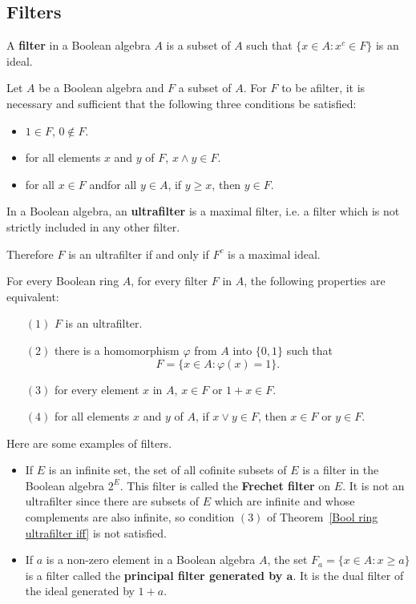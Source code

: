\subsection{Filters}
\begin{definition}
A \textbf{filter} in a Boolean algebra $A$ is a subset of $A$ such that $\{x\in A:x^c\in F\}$ is an ideal.
\end{definition}
\begin{proposition}
Let $A$ be a Boolean algebra and $F$ a subset of $A$. For $F$ to be afilter, it is necessary and sufficient that the following three conditions be satisfied:
\begin{itemize}
\item $1\in F$, $0\notin F$.
\item for all elements $x$ and $y$ of $F$, $x\wedge y\in F$.
\item for all $x\in F$ andfor all $y\in A$, if $y\geq x$, then $y\in F$.
\end{itemize}
\end{proposition}
\begin{definition}
In a Boolean algebra, an \textbf{ultrafilter} is a maximal filter, i.e. a filter which is not strictly included in any other filter.
\end{definition}
Therefore $F$ is an ultrafilter if and only if $F^c$ is a maximal ideal.
\begin{theorem}\label{Bool ring ultrafilter iff}
For every Boolean ring $A$, for every filter $F$ in $A$, the following properties are equivalent:
\begin{itemize}
\item[$(1)$] $F$ is an ultrafilter.
\item[$(2)$] there is a homomorphism $\varphi$ from $A$ into $\{0,1\}$ such that
\[F=\{x\in A:\varphi(x)=1\}.\] 
\item[$(3)$] for every element $x$ in $A$, $x\in F$ or $1+x\in F$.
\item[$(4)$] for all elements $x$ and $y$ of $A$, if $x\vee y\in F$, then $x\in F$ or $y\in F$.
\end{itemize}
\end{theorem}
\begin{example}
Here are some examples of filters.
\begin{itemize}
\item If $E$ is an infinite set, the set of all cofinite subsets of $E$ is a filter in the Boolean algebra $2^E$. 
This filter is called the \textbf{Frechet filter} on $E$. It is not an ultrafilter since there are subsets of $E$ 
which are infinite and whose complements are also infinite, so condition $(3)$ of Theorem~\ref{Bool ring ultrafilter iff} is not satisfied.
\item If $a$ is a non-zero element in a Boolean algebra $A$, the set $F_a=\{x\in A:x\geq a\}$ is a filter called the \textbf{principal filter generated by $\bm{a}$}. It is the dual
filter of the ideal generated by $1+a$.
\end{itemize}
\end{example}

